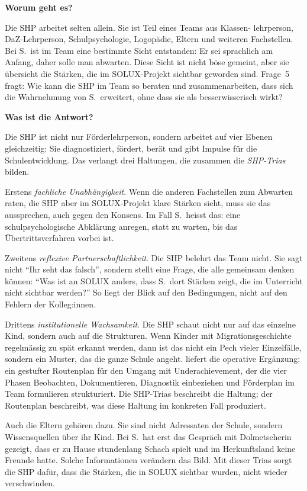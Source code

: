 \documentclass[ngerman, a4paper]{article}
\begin{document}
\begin{frageantwort5}
\textbf{Worum geht es?}

Die SHP arbeitet selten allein. Sie ist Teil eines Teams aus Klassen-
lehrperson, DaZ-Lehrperson, Schulpsychologie, Logopädie, Eltern und
weiteren Fachstellen. Bei S.~ist im Team eine bestimmte Sicht entstanden:
Er sei sprachlich am Anfang, daher solle man abwarten. Diese Sicht ist
nicht böse gemeint, aber sie übersieht die Stärken, die im SOLUX-Projekt
sichtbar geworden sind. Frage~5 fragt: Wie kann die SHP im Team so
beraten und zusammenarbeiten, dass sich die Wahrnehmung von S.~erweitert,
ohne dass sie als besserwisserisch wirkt?

\medskip
\textbf{Was ist die Antwort?}

Die SHP ist nicht nur Förderlehrperson, sondern arbeitet auf vier Ebenen
gleichzeitig: Sie diagnostiziert, fördert, berät und gibt Impulse für
die Schulentwicklung. Das verlangt drei Haltungen, die zusammen die
\emph{SHP-Trias} bilden.

Erstens \emph{fachliche Unabhängigkeit}. Wenn die anderen Fachstellen
zum Abwarten raten, die SHP aber im SOLUX-Projekt klare Stärken sieht,
muss sie das aussprechen, auch gegen den Konsens. Im Fall S.~heisst das:
eine schulpsychologische Abklärung anregen, statt zu warten, bis das
Übertrittsverfahren vorbei ist.

Zweitens \emph{reflexive Partnerschaftlichkeit}. Die SHP belehrt das Team
nicht. Sie sagt nicht \enquote{Ihr seht das falsch}, sondern stellt eine
Frage, die alle gemeinsam denken können: \enquote{Was ist an SOLUX
anders, dass S.~dort Stärken zeigt, die im Unterricht nicht sichtbar
werden?} So liegt der Blick auf den Bedingungen, nicht auf den Fehlern
der Kolleg:innen.

Drittens \emph{institutionelle Wachsamkeit}. Die SHP schaut nicht nur
auf das einzelne Kind, sondern auch auf die Strukturen. Wenn Kinder mit
Migrationsgeschichte regelmässig zu spät erkannt werden, dann ist das
nicht ein Pech vieler Einzelfälle, sondern ein Muster, das die ganze
Schule angeht. \textcite[S.\,75--80]{ziesenitz2024routenplan} liefert die
operative Ergänzung: ein gestufter Routenplan für den Umgang mit
Underachievement, der die vier Phasen Beobachten, Dokumentieren,
Diagnostik einbeziehen und Förderplan im Team formulieren strukturiert.
Die SHP-Trias beschreibt die Haltung; der Routenplan beschreibt, was
diese Haltung im konkreten Fall produziert.

Auch die Eltern gehören dazu. Sie sind nicht Adressaten der Schule,
sondern Wissensquellen über ihr Kind. Bei S.~hat erst das Gespräch mit
Dolmetscherin gezeigt, dass er zu Hause stundenlang Schach spielt und
im Herkunftsland keine Freunde hatte. Solche Informationen verändern
das Bild. Mit dieser Trias sorgt die SHP dafür, dass die Stärken, die
in SOLUX sichtbar wurden, nicht wieder verschwinden.
\end{frageantwort5}
 
\end{document}
